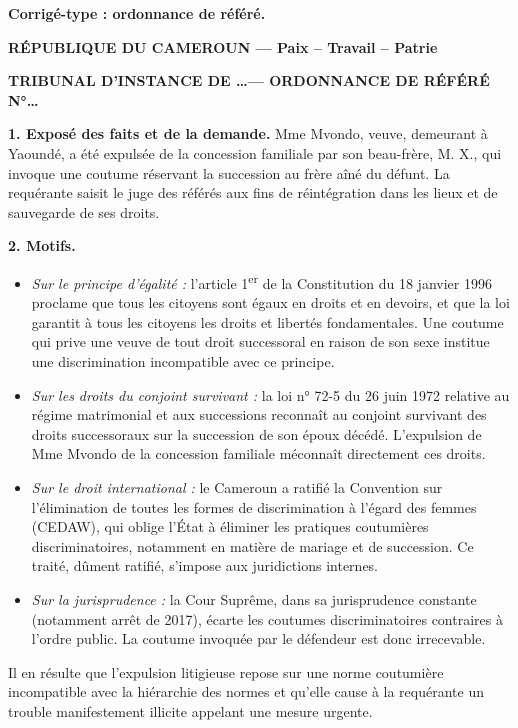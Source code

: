 \documentclass[11pt]{article}
\begin{document}
\begin{corrige}
\textbf{Corrigé-type : ordonnance de référé.}

\textbf{RÉPUBLIQUE DU CAMEROUN — Paix -- Travail -- Patrie}

\textbf{TRIBUNAL D'INSTANCE DE \ldots — ORDONNANCE DE RÉFÉRÉ N°\ldots}

\textbf{1. Exposé des faits et de la demande.} Mme Mvondo, veuve, demeurant à Yaoundé, a été expulsée de la concession familiale par son beau-frère, M. X., qui invoque une coutume réservant la succession au frère aîné du défunt. La requérante saisit le juge des référés aux fins de réintégration dans les lieux et de sauvegarde de ses droits.

\textbf{2. Motifs.}
\begin{itemize}
\item \emph{Sur le principe d'égalité :} l'article 1\textsuperscript{er} de la Constitution du 18 janvier 1996 proclame que tous les citoyens sont égaux en droits et en devoirs, et que la loi garantit à tous les citoyens les droits et libertés fondamentales. Une coutume qui prive une veuve de tout droit successoral en raison de son sexe institue une discrimination incompatible avec ce principe.
\item \emph{Sur les droits du conjoint survivant :} la loi n° 72-5 du 26 juin 1972 relative au régime matrimonial et aux successions reconnaît au conjoint survivant des droits successoraux sur la succession de son époux décédé. L'expulsion de Mme Mvondo de la concession familiale méconnaît directement ces droits.
\item \emph{Sur le droit international :} le Cameroun a ratifié la Convention sur l'élimination de toutes les formes de discrimination à l'égard des femmes (CEDAW), qui oblige l'État à éliminer les pratiques coutumières discriminatoires, notamment en matière de mariage et de succession. Ce traité, dûment ratifié, s'impose aux juridictions internes.
\item \emph{Sur la jurisprudence :} la Cour Suprême, dans sa jurisprudence constante (notamment arrêt de 2017), écarte les coutumes discriminatoires contraires à l'ordre public. La coutume invoquée par le défendeur est donc irrecevable.
\end{itemize}
Il en résulte que l'expulsion litigieuse repose sur une norme coutumière incompatible avec la hiérarchie des normes et qu'elle cause à la requérante un trouble manifestement illicite appelant une mesure urgente.


\end{corrige}
\end{document}
